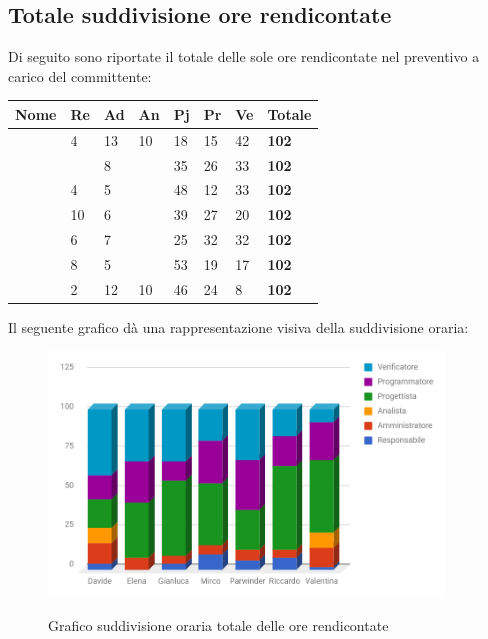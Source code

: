 \documentclass[PianoDiProgetto.tex]{subfiles}
\begin{document}
\subsection{Totale suddivisione ore rendicontate}
Di seguito sono riportate il totale delle sole ore rendicontate nel preventivo a carico del committente:
\begin{center}
	\begin{table}[htbp]
		\centering
		\renewcommand\arraystretch{1.5}
		\begin{tabularx}{\textwidth}{p{4cm}|p{1cm}|p{1cm}|p{1cm}|p{1cm}|p{1cm}|p{1cm}|p{2cm}}
			\hline
			\textbf{Nome} & \textbf{Re} & \textbf{Ad} & \textbf{An} & \textbf{Pj} & \textbf{Pr} & \textbf{Ve} & \textbf{Totale} \\
			\hline
			\Davide & 4 & 13 & 10 & 18 & 15 & 42 & \textbf{102} \\
			\hline
			\Elena & \ & 8 & \ & 35 & 26 & 33 & \textbf{102} \\
			\hline
			\Gianluca & 4 & 5 & \ & 48 & 12 & 33 & \textbf{102} \\
			\hline
			\Mirco & 10 & 6 & \ & 39 & 27 & 20 & \textbf{102} \\
			\hline
			\Parwinder & 6 & 7 & \ & 25 & 32 & 32 & \textbf{102} \\
			\hline
			\Riccardo & 8 & 5 & \ & 53 & 19 & 17 & \textbf{102} \\
			\hline
			\Valentina & 2 & 12 & 10 & 46 & 24 & 8 & \textbf{102} \\
			\hline
		\end{tabularx}
	\end{table}
\end{center}
Il seguente grafico dà una rappresentazione visiva della suddivisione oraria:\\
\begin{figure}[h]
	\centering
	\includegraphics[width=10.5cm]{images/prospettoOrario/totRen.png}
	\label{fig:foo}
	\caption{Grafico suddivisione oraria totale delle ore rendicontate}
\end{figure} 
\clearpage
\end{document}
